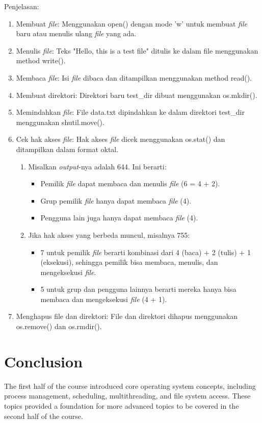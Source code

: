 \documentclass[12pt]{article}
\begin{document}
Penjelasan:
\begin{enumerate}
    \item Membuat \textit{file}: Menggunakan open() dengan mode 'w' untuk membuat \textit{file} baru atau menulis ulang \textit{file} yang ada.
    \item Menulis \textit{file}: Teks "Hello, this is a test file" ditulis ke dalam file menggunakan method write().
    \item Membaca \textit{file}: Isi \textit{file} dibaca dan ditampilkan menggunakan method read().
    \item Membuat direktori: Direktori baru test_dir dibuat menggunakan os.mkdir().
    \item Memindahkan \textit{file}: File data.txt dipindahkan ke dalam direktori test_dir menggunakan shutil.move().
    \item Cek hak akses \textit{file}: Hak akses \textit{file} dicek menggunakan os.stat() dan ditampilkan dalam format oktal. 
    \begin{enumerate}
        \item Misalkan \textit{output}-nya adalah 644. Ini berarti:
        \begin{itemize}
            \item Pemilik \textit{file} dapat membaca dan menulis \textit{file} (6 = 4 + 2).
            \item Grup pemilik \textit{file} hanya dapat membaca \textit{file} (4).
            \item Pengguna lain juga hanya dapat membaca \textit{file} (4).
        \end{itemize}
        \item Jika hak akses yang berbeda muncul, misalnya 755:
        \begin{itemize}
            \item 7 untuk pemilik \textit{file} berarti kombinasi dari 4 (baca) + 2 (tulis) + 1 (eksekusi), sehingga pemilik bisa membaca, menulis, dan mengeksekusi \textit{file}.
            \item 5 untuk grup dan pengguna lainnya berarti mereka hanya bisa membaca dan mengeksekusi \textit{file} (4 + 1).
        \end{itemize}
    \end{enumerate}
    \item Menghapus file dan direktori: File dan direktori dihapus menggunakan os.remove() dan os.rmdir().
\end{enumerate}

\section{Conclusion}
The first half of the course introduced core operating system concepts, including process management, scheduling, multithreading, and file system access. These topics provided a foundation for more advanced topics to be covered in the second half of the course.
\end{document}
